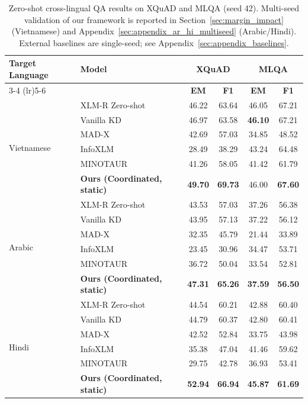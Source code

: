 \documentclass[11pt]{article}
\begin{document}
\begin{table}[t]
\centering
\begin{tabular}{llcccc}
\toprule
\multirow{2}{*}{\textbf{Target Language}} & \multirow{2}{*}{\textbf{Model}} & \multicolumn{2}{c}{\textbf{XQuAD}} & \multicolumn{2}{c}{\textbf{MLQA}} \\
\cmidrule(lr){3-4} \cmidrule(lr){5-6}
 & & \textbf{EM} & \textbf{F1} & \textbf{EM} & \textbf{F1} \\
\midrule
\multirow{6}{*}{Vietnamese}
 & XLM-R Zero-shot & 46.22 & 63.64 & 46.05 & 67.21 \\
 & Vanilla KD \citep{hinton2015distillingknowledgeneuralnetwork} & 46.97 & 63.58 & \textbf{46.10} & 67.21 \\
 & MAD-X \citep{pfeiffer-etal-2020-mad} & 42.69 & 57.03 & 34.85 & 48.52 \\
 & InfoXLM \citep{chi-etal-2021-infoxlm} & 28.49 & 38.29 & 43.24 & 64.48 \\
 & MINOTAUR \citep{sherborne-etal-2023-optimal} & 41.26 & 58.05 & 41.42 & 61.79 \\
 & \textbf{Ours (Coordinated, static)} & \textbf{49.70} & \textbf{69.73} & 46.00 & \textbf{67.60} \\
\midrule
\multirow{6}{*}{Arabic}
 & XLM-R Zero-shot & 43.53 & 57.03 & 37.26 & 56.38 \\
 & Vanilla KD \citep{hinton2015distillingknowledgeneuralnetwork} & 43.95 & 57.13 & 37.22 & 56.12 \\
 & MAD-X \citep{pfeiffer-etal-2020-mad} & 32.35 & 45.79 & 21.44 & 33.89 \\
 & InfoXLM \citep{chi-etal-2021-infoxlm} & 23.45 & 30.96 & 34.47 & 53.71 \\
 & MINOTAUR \citep{sherborne-etal-2023-optimal} & 36.72 & 50.04 & 33.54 & 52.81 \\
 & \textbf{Ours (Coordinated, static)} & \textbf{47.31} & \textbf{65.26} & \textbf{37.59} & \textbf{56.50} \\
\midrule
\multirow{6}{*}{Hindi}
 & XLM-R Zero-shot & 44.54 & 60.21 & 42.88 & 60.40 \\
 & Vanilla KD \citep{hinton2015distillingknowledgeneuralnetwork} & 44.79 & 60.37 & 42.80 & 60.41 \\
 & MAD-X \citep{pfeiffer-etal-2020-mad} & 42.52 & 52.84 & 33.75 & 43.98 \\
 & InfoXLM \citep{chi-etal-2021-infoxlm} & 35.38 & 47.04 & 41.46 & 59.62 \\
 & MINOTAUR \citep{sherborne-etal-2023-optimal} & 29.75 & 42.78 & 36.93 & 53.41 \\
 & \textbf{Ours (Coordinated, static)} & \textbf{52.94} & \textbf{66.94} & \textbf{45.87} & \textbf{61.69} \\
\bottomrule
\end{tabular}
\caption{Zero-shot cross-lingual QA results on XQuAD and MLQA (seed 42). Multi-seed validation of our framework is reported in Section~\ref{sec:margin_impact} (Vietnamese) and Appendix~\ref{sec:appendix_ar_hi_multiseed} (Arabic/Hindi). External baselines are single-seed; see Appendix~\ref{sec:appendix_baselines}.}
\label{tab:main_results}
\end{table}
\end{document}
